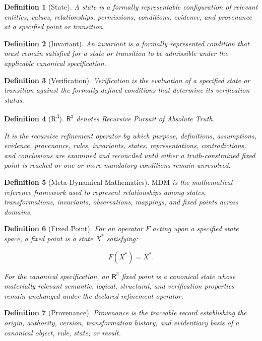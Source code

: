 \documentclass[11pt]{article}
\newcommand{\Rthree}{\ensuremath{\mathsf{R}^{3}}}
\newcommand{\MDM}{\ensuremath{\mathrm{MDM}}}
\newtheorem{definition}{Definition}
\begin{document}
\begin{definition}[State]
A state is a formally representable configuration of relevant
entities, values, relationships, permissions, conditions,
evidence, and provenance at a specified point or transition.
\end{definition}

\begin{definition}[Invariant]
An invariant is a formally represented condition that must remain
satisfied for a state or transition to be admissible under the
applicable canonical specification.
\end{definition}

\begin{definition}[Verification]
Verification is the evaluation of a specified state or transition
against the formally defined conditions that determine its
verification status.
\end{definition}

\begin{definition}[R\textsuperscript{3}]
\Rthree{} denotes \emph{Recursive Pursuit of Absolute Truth}.

It is the recursive refinement operator by which purpose,
definitions, assumptions, evidence, provenance, rules,
invariants, states, representations, contradictions, and
conclusions are examined and reconciled until either a
truth-constrained fixed point is reached or one or more
mandatory conditions remain unresolved.
\end{definition}

\begin{definition}[Meta-Dynamical Mathematics]
\MDM{} is the mathematical reference framework used to represent
relationships among states, transformations, invariants,
observations, mappings, and fixed points across domains.
\end{definition}

\begin{definition}[Fixed Point]
For an operator $F$ acting upon a specified state space, a fixed
point is a state $X^{*}$ satisfying:

\[
F(X^{*})=X^{*}.
\]

For the canonical specification, an \Rthree{} fixed point is a
canonical state whose materially relevant semantic, logical,
structural, and verification properties remain unchanged under
the declared refinement operator.
\end{definition}

\begin{definition}[Provenance]
Provenance is the traceable record establishing the origin,
authority, version, transformation history, and evidentiary basis
of a canonical object, rule, state, or result.
\end{definition}
\end{document}
